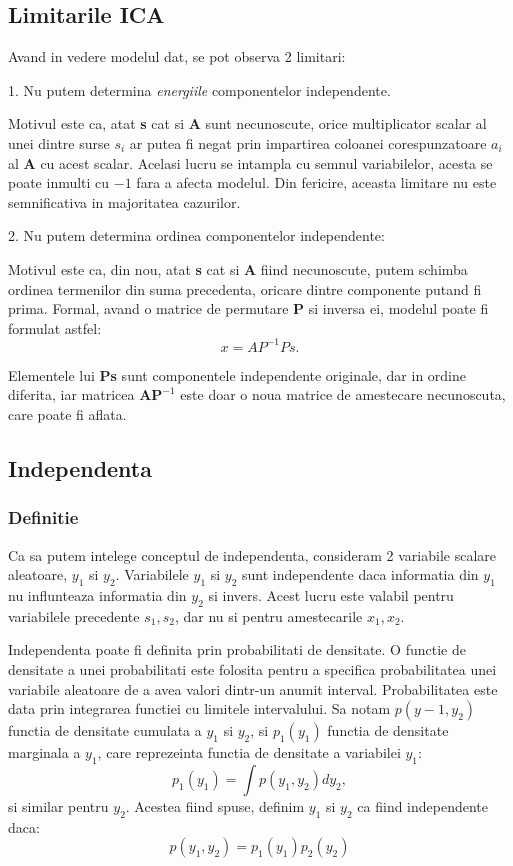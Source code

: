 \documentclass[12pt]{article}
\begin{document}
\subsection{Limitarile ICA}
Avand in vedere modelul dat, se pot observa 2 limitari:

1. Nu putem determina \textit{energiile} componentelor independente.

Motivul este ca, atat \textbf{s} cat si \textbf{A} sunt necunoscute, orice multiplicator scalar al unei dintre surse $s_i$ ar putea fi negat prin impartirea coloanei corespunzatoare $a_i$ al \textbf{A} cu acest scalar. Acelasi lucru se intampla cu semnul variabilelor, acesta se poate inmulti cu $-1$ fara a afecta modelul. Din fericire, aceasta limitare nu este semnificativa in majoritatea cazurilor.

2. Nu putem determina ordinea componentelor independente:

Motivul este ca, din nou, atat \textbf{s} cat si \textbf{A} fiind necunoscute, putem schimba ordinea termenilor din suma precedenta, oricare dintre componente putand fi prima. Formal, avand o matrice de permutare \textbf{P} si inversa ei, modelul poate fi formulat astfel:
\begin{equation}
	x=AP^{-1}Ps.
\end{equation}

Elementele lui \textbf{Ps} sunt componentele independente originale, dar in ordine diferita, iar matricea $\textbf{AP}^{-1}$ este doar o noua matrice de amestecare necunoscuta, care poate fi aflata.
\newpage

\subsection{Independenta}
\subsubsection{Definitie} 

Ca sa putem intelege conceptul de independenta, consideram 2 variabile scalare aleatoare, $y_1$ si $y_2$. Variabilele $y_1$ si $y_2$ sunt independente daca informatia din $y_1$ nu influnteaza informatia din $y_2$ si invers. Acest lucru este valabil pentru variabilele precedente $s_1,s_2$, dar nu si pentru amestecarile $x_1,x_2$.

Independenta poate fi definita prin probabilitati de densitate. O functie de densitate a unei probabilitati este folosita pentru a specifica probabilitatea unei variabile aleatoare de a avea valori dintr-un anumit interval. Probabilitatea este data prin integrarea functiei cu limitele intervalului. Sa notam $p(y-1,y_2)$ functia de densitate cumulata a $y_1$ si $y_2$, si $p_1(y_1)$ functia de densitate marginala a $y_1$, care reprezeinta functia de densitate a variabilei $y_1$:
\begin{equation}
p_1(y_1)=\int{p(y_1,y_2)dy_2},
\end{equation}
si similar pentru $y_2$. Acestea fiind spuse, definim $y_1$ si $y_2$ ca fiind independente daca:
\begin{equation}
	p(y_1,y_2)=p_1(y_1)p_2(y_2)
\end{equation}
\end{document}
